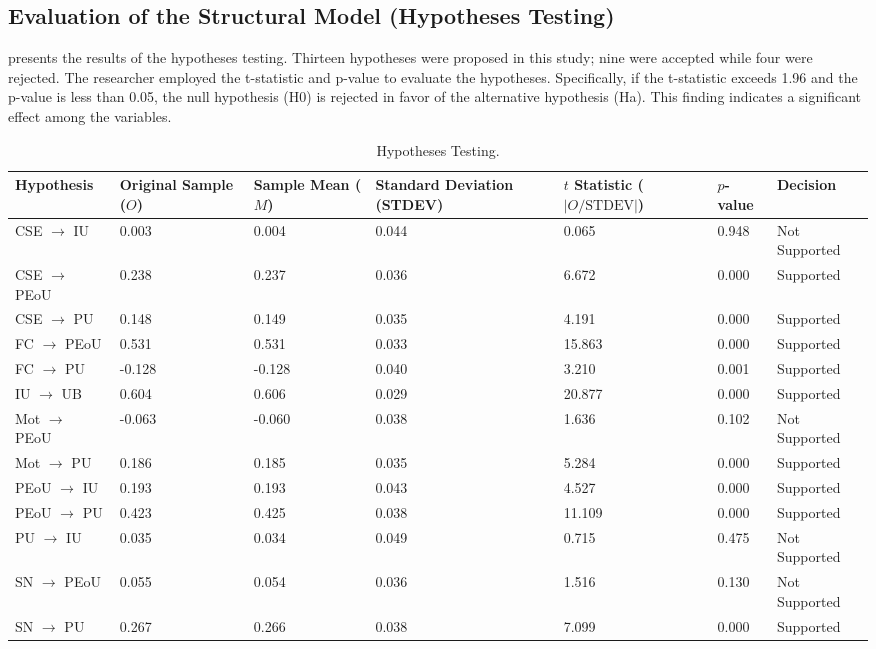\documentclass[english]{textolivre}
\begin{document}
\subsection{Evaluation of the Structural Model (Hypotheses Testing)}\label{sec-format-simple}
 presents the results of the hypotheses testing. Thirteen hypotheses were proposed in this study; nine were accepted while four were rejected. The researcher employed the t-statistic and p-value to evaluate the hypotheses. Specifically, if the t-statistic exceeds 1.96 and the p-value is less than 0.05, the null hypothesis (H0) is rejected in favor of the alternative hypothesis (Ha). This finding indicates a significant effect among the variables.

\begin{table}[htbp]
\centering
\begin{threeparttable}
\caption{Hypotheses Testing.}
\label{tab8}
\begin{tabular}{>{\raggedright}p{2cm} >{\raggedright}p{1.5cm} >{\raggedright}p{1.5cm} >{\raggedright}p{1.5cm} >{\raggedright}p{1.5cm} >{\raggedright}p{1.5cm} >{\raggedright\arraybackslash}p{1.5cm}}
\toprule
Hypothesis &
Original Sample ($O$) &
Sample Mean ($M$) &
Standard Deviation (STDEV) &
$t$ Statistic ($|O/\mathrm{STDEV}|$) &
$p$-value &
Decision \\
\midrule
CSE $\rightarrow$ IU    &  0.003 &  0.004 & 0.044 &  0.065 & 0.948 & Not Supported \\
CSE $\rightarrow$ PEoU  &  0.238 &  0.237 & 0.036 &  6.672 & 0.000 & Supported \\
CSE $\rightarrow$ PU    &  0.148 &  0.149 & 0.035 &  4.191 & 0.000 & Supported \\
FC $\rightarrow$ PEoU   &  0.531 &  0.531 & 0.033 & 15.863 & 0.000 & Supported \\
FC $\rightarrow$ PU     & -0.128 & -0.128 & 0.040 &  3.210 & 0.001 & Supported \\
IU $\rightarrow$ UB     &  0.604 &  0.606 & 0.029 & 20.877 & 0.000 & Supported \\
Mot $\rightarrow$ PEoU  & -0.063 & -0.060 & 0.038 &  1.636 & 0.102 & Not Supported \\
Mot $\rightarrow$ PU    &  0.186 &  0.185 & 0.035 &  5.284 & 0.000 & Supported \\
PEoU $\rightarrow$ IU   &  0.193 &  0.193 & 0.043 &  4.527 & 0.000 & Supported \\
PEoU $\rightarrow$ PU   &  0.423 &  0.425 & 0.038 & 11.109 & 0.000 & Supported \\
PU $\rightarrow$ IU     &  0.035 &  0.034 & 0.049 &  0.715 & 0.475 & Not Supported \\
SN $\rightarrow$ PEoU   &  0.055 &  0.054 & 0.036 &  1.516 & 0.130 & Not Supported \\
SN $\rightarrow$ PU     &  0.267 &  0.266 & 0.038 &  7.099 & 0.000 & Supported \\
\bottomrule
\end{tabular}
\end{threeparttable}
\end{table}
\end{document}
